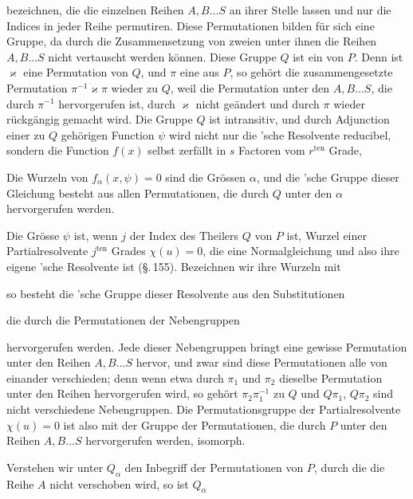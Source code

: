 
bezeichnen, die die einzelnen Reihen $A, B \dots S$ an ihrer
Stelle lassen und nur die Indices in jeder Reihe permutiren.
Diese Permutationen bilden für sich eine Gruppe, da durch die
Zusammensetzung von zweien unter ihnen die Reihen $A, B \dots
S$ nicht vertauscht werden können. Diese Gruppe $Q$ ist ein
 von $P$. Denn ist $\varkappa$ eine Permutation von
$Q$, und $\pi$ eine aus $P$, so gehört die zusammengesetzte
Permutation $\pi^{-1} \varkappa \pi$ wieder zu $Q$, weil die
Permutation unter den $A, B \dots S$, die durch $\pi^{-1}$
hervorgerufen ist, durch $\varkappa$ nicht geändert und durch
$\pi$ wieder rückgängig gemacht wird. Die Gruppe $Q$ ist
intransitiv, und durch Adjunction einer zu $Q$ gehörigen
Function $\psi$ wird nicht nur die 'sche Resolvente
reducibel, sondern die Function $f(x)$ selbst zerfällt in $s$
Factoren vom $r^{\mathrm{ten}}$ Grade,


Die Wurzeln von $f_\alpha(x,\psi) = 0$ sind die Grössen $\alpha$,
und die 'sche Gruppe dieser Gleichung besteht aus allen
Permutationen, die durch $Q$ unter den $\alpha$ hervorgerufen
werden.

Die Grösse $\psi$ ist, wenn $j$ der Index des Theilers $Q$ von
$P$ ist, Wurzel einer Partialresolvente $j^{\mathrm{ten}}$
Grades $\chi(u) = 0$, die eine Normalgleichung und also ihre
eigene 'sche Resolvente ist (\S.\,155). Bezeichnen wir
ihre Wurzeln mit


so besteht die 'sche Gruppe dieser Resolvente aus den
Substitutionen


die durch die Permutationen der Nebengruppen


hervorgerufen werden. Jede dieser Nebengruppen bringt eine
gewisse Permutation unter den Reihen $A, B \dots S$ hervor, und
zwar sind diese Permutationen alle von einander verschieden;
denn wenn etwa durch $\pi_1$ und $\pi_2$ dieselbe Permutation
unter den Reihen hervorgerufen wird, so gehört $\pi_2 \pi_1^{-1}$
zu $Q$ und $Q\pi_1$, $Q\pi_2$ sind nicht verschiedene
Nebengruppen. Die Permutationsgruppe der Partialresolvente
$\chi(u) = 0$ ist also mit der Gruppe der Permutationen, die
durch $P$ unter den Reihen $A, B \dots S$ hervorgerufen werden,
isomorph.

Verstehen wir unter $Q_\alpha$ den Inbegriff der Permutationen
von $P$, durch die die Reihe $A$ nicht verschoben wird, so ist
$Q_\alpha$
